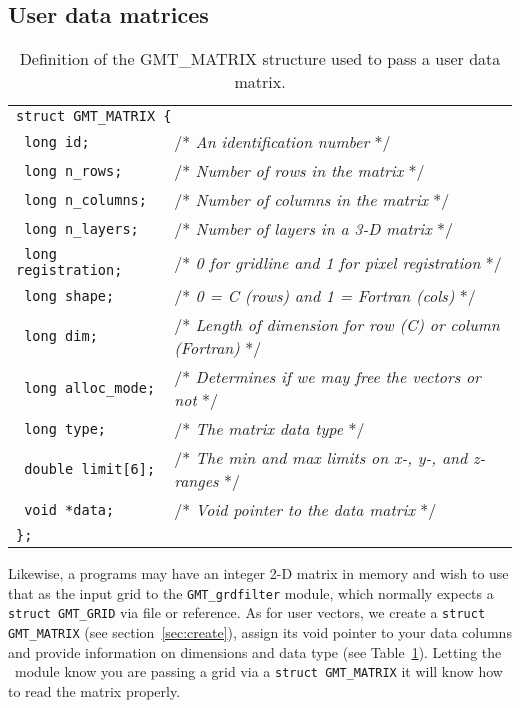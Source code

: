 \documentclass{report}
\begin{document}
\subsection{User data matrices}

\begin{table}[h]
\small
\centering
\begin{tabular}{ll} \hline
\multicolumn{2}{l}{\texttt{struct GMT\_MATRIX \{}} \\ 
\texttt{	long id;}		&       /* {\it An identification number} */ \\
\texttt{	long n\_rows;}		&       /* {\it Number of rows in the matrix} */ \\
\texttt{	long n\_columns;}	&       /* {\it Number of columns in the matrix}  */\\
\texttt{	long n\_layers;}	&       /* {\it Number of layers in a 3-D matrix}  */\\
\texttt{	long registration;}	&       /* {\it 0 for gridline and 1 for pixel registration}  */\\
\texttt{	long shape;}		&       /* {\it 0 = C (rows) and 1 = Fortran (cols)}  */\\
\texttt{	long dim;}		&       /* {\it Length of dimension for row (C) or column (Fortran)}  */\\
\texttt{	long alloc\_mode;}	&       /* {\it Determines if we may free the vectors or not}  */\\
\texttt{	long type;}		&       /* {\it The matrix data type}  */\\
\texttt{	double limit[6];}	&       /* {\it The min and max limits on x-, y-, and z-ranges}  */\\
\texttt{	void *data;}		&       /* {\it Void pointer to the data matrix}  */\\
\texttt{\};}	&        \\  \hline
\end{tabular}
\caption{Definition of the GMT\_MATRIX structure used to pass a user data matrix.}
\label{tbl:matrix}
\end{table}
\noindent
Likewise, a programs may have an integer 2-D matrix in memory 
and wish to use that as the input grid to the \texttt{GMT\_grdfilter} module, which normally
expects a \texttt{struct GMT\_GRID} via file or reference.  As for user vectors, we create a
\texttt{struct GMT\_MATRIX} (see section~\ref{sec:create}), assign its void pointer to your data
columns and provide information on dimensions and data type (see Table~\ref{tbl:matrix}).
Letting the \GMT\ module know you are passing a grid via a
\texttt{struct GMT\_MATRIX} it will know how to read the matrix properly.
\end{document}
